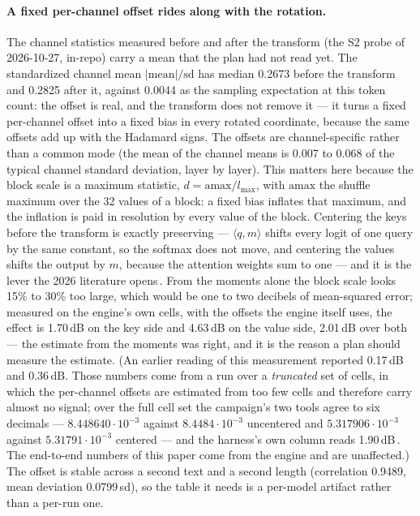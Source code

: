 \documentclass[10pt,twocolumn]{article}
\begin{document}
\paragraph{A fixed per-channel offset rides along with the rotation.} The channel statistics measured before and after the transform (the S2 probe of 2026-10-27, in-repo) carry a mean that the plan had not read yet. The standardized channel mean $|\mathrm{mean}|/\mathrm{sd}$ has median 0.2673 before the transform and 0.2825 after it, against 0.0044 as the sampling expectation at this token count: the offset is real, and the transform does not remove it --- it turns a fixed per-channel offset into a fixed bias in every rotated coordinate, because the same offsets add up with the Hadamard signs. The offsets are channel-specific rather than a common mode (the mean of the channel means is 0.007 to 0.068 of the typical channel standard deviation, layer by layer). This matters here because the block scale is a maximum statistic, $d = \mathrm{amax}/l_{\max}$, with $\mathrm{amax}$ the shuffle maximum over the 32 values of a block: a fixed bias inflates that maximum, and the inflation is paid in resolution by every value of the block. Centering the keys before the transform is exactly preserving --- $\langle q, m\rangle$ shifts every logit of one query by the same constant, so the softmax does not move, and centering the values shifts the output by $m$, because the attention weights sum to one --- and it is the lever the 2026 literature opens\,\cite{optr}. From the moments alone the block scale looks 15\% to 30\% too large, which would be one to two decibels of mean-squared error; measured on the engine's own cells, with the offsets the engine itself uses, the effect is 1.70\,dB on the key side and 4.63\,dB on the value side, 2.01\,dB over both --- the estimate from the moments was right, and it is the reason a plan should measure the estimate. (An earlier reading of this measurement reported 0.17\,dB and 0.36\,dB. Those numbers come from a run over a \emph{truncated} set of cells, in which the per-channel offsets are estimated from too few cells and therefore carry almost no signal; over the full cell set the campaign's two tools agree to six decimals --- $8.448640\cdot10^{-3}$ against $8.4484\cdot10^{-3}$ uncentered and $5.317906\cdot10^{-3}$ against $5.31791\cdot10^{-3}$ centered --- and the harness's own column reads 1.90\,dB\,\cite{strata-codec}. The end-to-end numbers of this paper come from the engine and are unaffected.) The offset is stable across a second text and a second length (correlation 0.9489, mean deviation 0.0799\,sd), so the table it needs is a per-model artifact rather than a per-run one.
\end{document}
